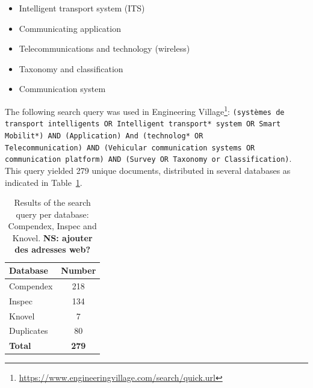 \begin{itemize}
\item Intelligent transport system (ITS) 
\item Communicating application 
\item Telecommunications and technology (wireless) 
\item Taxonomy and classification
\item Communication system
\end{itemize}

The following search query was used in Engineering Village\footnote{\url{https://www.engineeringvillage.com/search/quick.url}}: \texttt{(systèmes de transport intelligents OR Intelligent transport* system OR Smart Mobilit*) AND (Application) And (technolog* OR \\ Telecommunication) AND (Vehicular communication systems OR communication platform) AND (Survey OR Taxonomy or Classification)}. This query yielded 279 unique documents, distributed in several databases as indicated in Table~\ref{tab:data_base}.

\begin{table}[ht!]
\centering
\begin{tabular}[ht!]{lc}
\hline
Database &Number\\
\hline
Compendex&218\\
Inspec&134\\
Knovel&7\\
Duplicates&80\\
\bf {Total}&\bf{279}\\
\hline
\end{tabular}
\caption{Results of the search query per database: Compendex, Inspec and Knovel. {\bf NS: ajouter des adresses web?}}
\label{tab:data_base}
\end{table}



